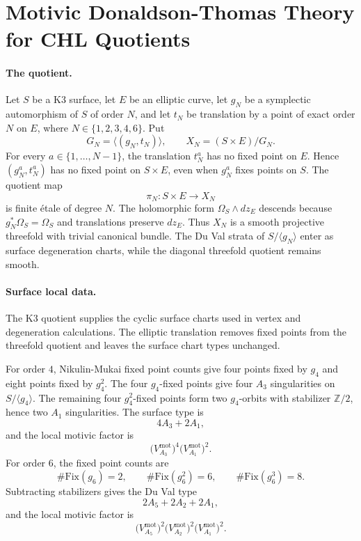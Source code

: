 \section{Motivic Donaldson-Thomas Theory for CHL Quotients}
\label{wn:sec:motivic-DT-CHL-N-ge-2}

\providecommand{\DTmot}{Z^{\mathrm{red},\mathrm{mot}}_{\mathrm{DT}}}
\providecommand{\FCHL}{F^{\mathrm{CHL}}}
\providecommand{\FDD}{F^{\mathrm{dd}}}
\providecommand{\Lmot}{\mathbb L^{1/2}}
\providecommand{\KSring}{\mathcal M^{\widehat\mu}_{\mathbb C}}
\providecommand{\MOmot}{\Omega^{\mathrm{mot}}}
\providecommand{\PhiOP}{\Phi_{10}^{\mathrm{OP}}}
\providecommand{\Phiun}{\Phi_{10}^{\mathrm{un}}}
\providecommand{\kBKM}{\kappa_{\mathrm{BKM}}}
\providecommand{\kcat}{\kappa_{\mathrm{cat}}}
\providecommand{\kch}{\kappa_{\mathrm{ch}}}
\providecommand{\kfib}{\kappa_{\mathrm{fiber}}}

\paragraph{The quotient.}
Let $S$ be a K3 surface, let $E$ be an elliptic curve, let $g_N$ be a
symplectic automorphism of $S$ of order $N$, and let $t_N$ be
translation by a point of exact order $N$ on $E$, where
$N\in\{1,2,3,4,6\}$. Put
\[
  G_N=\langle(g_N,t_N)\rangle,\qquad
  X_N=(S\times E)/G_N .
\]
For every $a\in\{1,\ldots,N-1\}$, the translation $t_N^a$ has no fixed
point on $E$. Hence $(g_N^a,t_N^a)$ has no fixed point on $S\times E$,
even when $g_N^a$ fixes points on $S$. The quotient map
\[
  \pi_N:S\times E\longrightarrow X_N
\]
is finite \'etale of degree $N$. The holomorphic form
$\Omega_S\wedge dz_E$ descends because $g_N^*\Omega_S=\Omega_S$ and
translations preserve $dz_E$. Thus $X_N$ is a smooth projective
threefold with trivial canonical bundle. The Du Val strata of
$S/\langle g_N\rangle$ enter as surface degeneration charts, while the
diagonal threefold quotient remains smooth.

\paragraph{Surface local data.}
The K3 quotient supplies the cyclic surface charts used in vertex and
degeneration calculations. The elliptic translation removes fixed
points from the threefold quotient and leaves the surface chart types
unchanged.

For order $4$, Nikulin-Mukai fixed point counts give four points fixed
by $g_4$ and eight points fixed by $g_4^2$. The four $g_4$-fixed points
give four $A_3$ singularities on $S/\langle g_4\rangle$. The remaining
four $g_4^2$-fixed points form two $g_4$-orbits with stabilizer
$\mathbb Z/2$, hence two $A_1$ singularities. The surface type is
\[
  4A_3+2A_1,
\]
and the local motivic factor is
\[
  \bigl(V^{\mathrm{mot}}_{A_3}\bigr)^4
  \bigl(V^{\mathrm{mot}}_{A_1}\bigr)^2 .
\]
For order $6$, the fixed point counts are
\[
  \#\mathrm{Fix}(g_6)=2,\qquad
  \#\mathrm{Fix}(g_6^2)=6,\qquad
  \#\mathrm{Fix}(g_6^3)=8.
\]
Subtracting stabilizers gives the Du Val type
\[
  2A_5+2A_2+2A_1,
\]
and the local motivic factor is
\[
  \bigl(V^{\mathrm{mot}}_{A_5}\bigr)^2
  \bigl(V^{\mathrm{mot}}_{A_2}\bigr)^2
  \bigl(V^{\mathrm{mot}}_{A_1}\bigr)^2 .
\]

